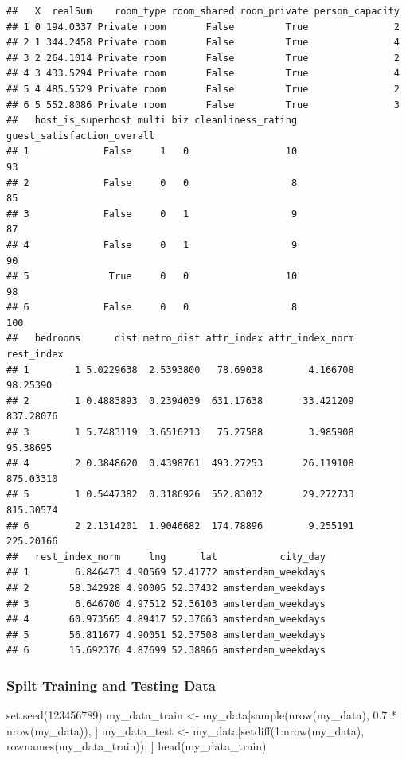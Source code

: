 \documentclass[
]{article}
\newenvironment{Shaded}{\begin{snugshade}}{\end{snugshade}}
\newcommand{\DecValTok}[1]{\textcolor[rgb]{0.00,0.00,0.81}{#1}}
\newcommand{\FloatTok}[1]{\textcolor[rgb]{0.00,0.00,0.81}{#1}}
\newcommand{\FunctionTok}[1]{\textcolor[rgb]{0.00,0.00,0.00}{#1}}
\newcommand{\NormalTok}[1]{#1}
\newcommand{\OtherTok}[1]{\textcolor[rgb]{0.56,0.35,0.01}{#1}}
\newcommand{\SpecialCharTok}[1]{\textcolor[rgb]{0.00,0.00,0.00}{#1}}
\begin{document}
\begin{verbatim}
##   X  realSum    room_type room_shared room_private person_capacity
## 1 0 194.0337 Private room       False         True               2
## 2 1 344.2458 Private room       False         True               4
## 3 2 264.1014 Private room       False         True               2
## 4 3 433.5294 Private room       False         True               4
## 5 4 485.5529 Private room       False         True               2
## 6 5 552.8086 Private room       False         True               3
##   host_is_superhost multi biz cleanliness_rating guest_satisfaction_overall
## 1             False     1   0                 10                         93
## 2             False     0   0                  8                         85
## 3             False     0   1                  9                         87
## 4             False     0   1                  9                         90
## 5              True     0   0                 10                         98
## 6             False     0   0                  8                        100
##   bedrooms      dist metro_dist attr_index attr_index_norm rest_index
## 1        1 5.0229638  2.5393800   78.69038        4.166708   98.25390
## 2        1 0.4883893  0.2394039  631.17638       33.421209  837.28076
## 3        1 5.7483119  3.6516213   75.27588        3.985908   95.38695
## 4        2 0.3848620  0.4398761  493.27253       26.119108  875.03310
## 5        1 0.5447382  0.3186926  552.83032       29.272733  815.30574
## 6        2 2.1314201  1.9046682  174.78896        9.255191  225.20166
##   rest_index_norm     lng      lat           city_day
## 1        6.846473 4.90569 52.41772 amsterdam_weekdays
## 2       58.342928 4.90005 52.37432 amsterdam_weekdays
## 3        6.646700 4.97512 52.36103 amsterdam_weekdays
## 4       60.973565 4.89417 52.37663 amsterdam_weekdays
## 5       56.811677 4.90051 52.37508 amsterdam_weekdays
## 6       15.692376 4.87699 52.38966 amsterdam_weekdays
\end{verbatim}

\hypertarget{spilt-training-and-testing-data}{%
\subsubsection{Spilt Training and Testing
Data}\label{spilt-training-and-testing-data}}

\begin{Shaded}
\begin{Highlighting}[]
\FunctionTok{set.seed}\NormalTok{(}\DecValTok{123456789}\NormalTok{)}
\NormalTok{my\_data\_train }\OtherTok{\textless{}{-}}\NormalTok{ my\_data[}\FunctionTok{sample}\NormalTok{(}\FunctionTok{nrow}\NormalTok{(my\_data), }\FloatTok{0.7} \SpecialCharTok{*} \FunctionTok{nrow}\NormalTok{(my\_data)),}
\NormalTok{    ]}
\NormalTok{my\_data\_test }\OtherTok{\textless{}{-}}\NormalTok{ my\_data[}\FunctionTok{setdiff}\NormalTok{(}\DecValTok{1}\SpecialCharTok{:}\FunctionTok{nrow}\NormalTok{(my\_data), }\FunctionTok{rownames}\NormalTok{(my\_data\_train)),}
\NormalTok{    ]}
\FunctionTok{head}\NormalTok{(my\_data\_train)}
\end{Highlighting}
\end{Shaded}
\end{document}
